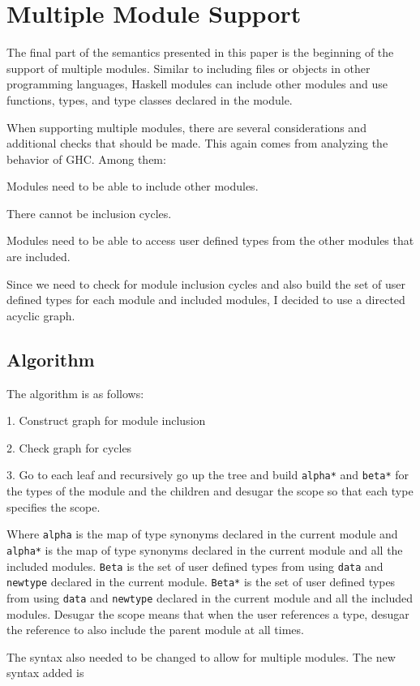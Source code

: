\chapter{Multiple Module Support}
The final part of the semantics presented in this paper is the beginning of the support of multiple modules. Similar to including files or objects in other programming languages, Haskell modules can include other modules and use functions, types, and type classes declared in the module.

When supporting multiple modules, there are several considerations and additional checks that should be made. This again comes from analyzing the behavior of GHC.
Among them:

Modules need to be able to include other modules.

There cannot be inclusion cycles.

Modules need to be able to access user defined types from the other modules that are included.

Since we need to check for module inclusion cycles and also build the set of user defined types for each module and included modules, I decided to use a directed acyclic graph.

\section{Algorithm}
The algorithm is as follows:

1. Construct graph for module inclusion

2. Check graph for cycles

3. Go to each leaf and recursively go up the tree and build \texttt{alpha*} and \texttt{beta*} for the types of the module and the children and desugar the scope so that each type specifies the scope.

Where \texttt{alpha} is the map of type synonyms declared in the current module and \texttt{alpha*} is the map of type synonyms declared in the current module and all the included modules. \texttt{Beta} is the set of user defined types from using \texttt{data} and \texttt{newtype} declared in the current module. \texttt{Beta*} is the set of user defined types from using \texttt{data} and \texttt{newtype} declared in the current module and all the included modules. 
Desugar the scope means that when the user references a type, desugar the reference to also include the parent module at all times.

The syntax also needed to be changed to allow for multiple modules. The new syntax added is

